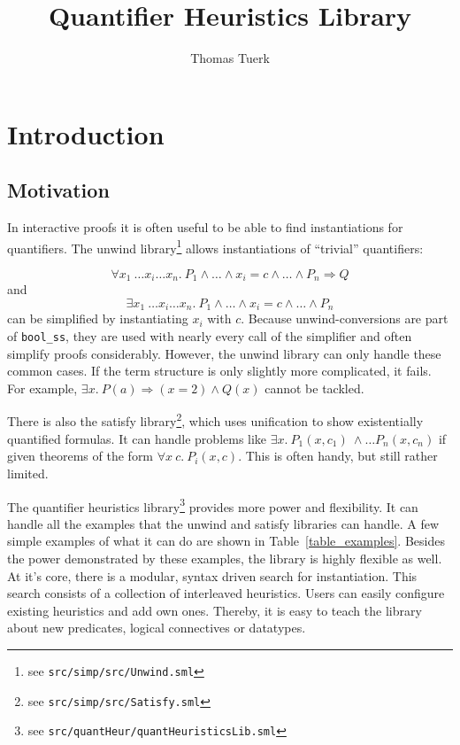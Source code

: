 \documentclass[a4paper,12pt,DIV=12,oneside]{scrbook}
\theoremstyle{definition}
\theoremstyle{remark}
\begin{document}
\title{Quantifier Heuristics Library}
\author{Thomas Tuerk}

\maketitle

\tableofcontents

\chapter{Introduction}
\section{Motivation}
\label{sec_motivation}

In interactive proofs it is often useful to be able to find instantiations
for quantifiers. The unwind library\footnote{see \texttt{src/simp/src/Unwind.sml}} allows
instantiations of ``trivial'' quantifiers:

\[ \forall x_1\ \ldots x_i \ldots x_n.\ P_1 \wedge \ldots \wedge x_i = c \wedge \ldots \wedge P_n \Longrightarrow Q \]
and
\[ \exists x_1\ \ldots x_i \ldots x_n.\ P_1 \wedge \ldots \wedge x_i =
c \wedge \ldots \wedge P_n \] can be simplified by
instantiating $x_i$ with $c$. Because unwind-conversions are
part of \texttt{bool\_ss}, they are used with nearly every call of the simplifier
and often simplify proofs considerably. However, the unwind library can only handle these common cases. If the term structure is
only slightly more complicated, it fails. For example, $\exists x.\ P(a) \Longrightarrow (x = 2) \wedge Q(x)$
cannot be tackled.

There is also the satisfy library\footnote{see \texttt{src/simp/src/Satisfy.sml}}, which uses unification to
show existentially quantified formulas. It can handle problems like
$\exists x.\ P_1(x,c_1)\ \wedge \ldots P_n(x,c_n)$ if given
theorems of the form $\forall x\ c.\ P_i(x, c)$. This is often handy, but still rather limited.

The quantifier heuristics library\footnote{see
  \texttt{src/quantHeur/quantHeuristicsLib.sml}} provides more power
and flexibility.  It can handle all the examples that the unwind and
satisfy libraries can handle. A few simple examples of what it can do
are shown in Table~\ref{table_examples}. Besides the power demonstrated
by these examples, the library is highly flexible as well.  At it's
core, there is a modular, syntax driven search for instantiation.
This search consists of a collection of interleaved heuristics.  Users
can easily configure existing heuristics and add own ones. Thereby, it
is easy to teach the library about new predicates, logical connectives
or datatypes.
\end{document}
